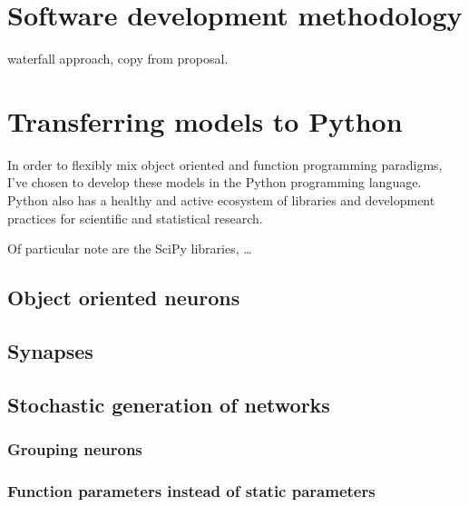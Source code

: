 \section{Software development methodology}

waterfall approach, copy from proposal.

\section{Transferring models to Python}

In order to flexibly mix
object oriented and function programming paradigms, I've chosen to develop these
models in the Python programming language. Python also has a healthy and active
ecosystem of libraries and development practices for scientific and statistical research.

Of particular note are the SciPy libraries, \ldots

\subsection{Object oriented neurons}

\subsection{Synapses}

\subsection{Stochastic generation of networks}

\subsubsection{Grouping neurons}

\subsubsection{Function parameters instead of static parameters}